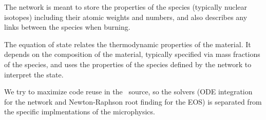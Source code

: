 The network is meant to store the properties of the species (typically
nuclear isotopes) including their atomic weights and numbers, and also
describes any links between the species when burning.  

The equation of state relates the thermodynamic properties of the
material.  It depends on the composition of the material, typically
specified via mass fractions of the species, and uses the properties
of the species defined by the network to interpret the state.

We try to maximize code reuse in the \microphysics\ source, so the
solvers (ODE integration for the network and Newton-Raphson root
finding for the EOS) is separated from the specific implmentations of
the microphysics.
